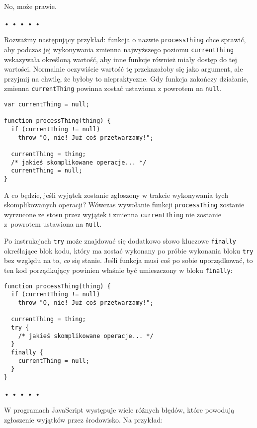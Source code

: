   
No, może prawie.



\begin{center}
• • • • •
\end{center}

  
Rozważmy następujący przykład: funkcja o nazwie \texttt{processThing} chce sprawić, aby podczas jej wykonywania zmienna najwyższego poziomu \texttt{currentThing} wskazywała określoną wartość, aby inne funkcje również miały dostęp do tej wartości. Normalnie oczywiście wartość tę przekazałoby się jako argument, ale przyjmij na chwilę, że byłoby to niepraktyczne. Gdy funkcja zakończy działanie, zmienna \texttt{currentThing} powinna zostać ustawiona z powrotem na \texttt{null}.

  
\begin{verbatim} 
var currentThing = null;

function processThing(thing) {
  if (currentThing != null)
    throw "O, nie! Już coś przetwarzamy!";

  currentThing = thing;
  /* jakieś skomplikowane operacje... */
  currentThing = null;
}
 \end{verbatim}
  
A co będzie, jeśli wyjątek zostanie zgłoszony w trakcie wykonywania tych skomplikowanych operacji? Wówczas wywołanie funkcji \texttt{processThing} zostanie wyrzucone ze stosu przez wyjątek i zmienna \texttt{currentThing} nie zostanie z~powrotem ustawiona na \texttt{null}.

  
Po instrukcjach \texttt{try} może znajdować się dodatkowo słowo kluczowe \texttt{finally} określające blok kodu, który ma zostać wykonany po próbie wykonania bloku \texttt{try} bez względu na to, \emph{co} się stanie. Jeśli funkcja musi coś po sobie uporządkować, to ten kod porządkujący powinien właśnie być umieszczony w bloku \texttt{finally}:

  
\begin{verbatim} 
function processThing(thing) {
  if (currentThing != null)
    throw "O, nie! Już coś przetwarzamy!";

  currentThing = thing;
  try {
    /* jakieś skomplikowane operacje... */
  }
  finally {
    currentThing = null;
  }
}
 \end{verbatim}


\begin{center}
• • • • •
\end{center}

  
W programach JavaScript występuje wiele różnych błędów, które powodują zgłoszenie wyjątków przez środowisko. Na przykład:

